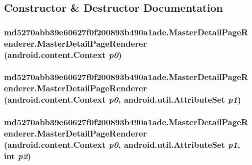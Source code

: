 \subsection{Constructor \& Destructor Documentation}
\hypertarget{classmd5270abb39e60627f0f200893b490a1ade_1_1_master_detail_page_renderer_2d9ba8d783e2532ed875ba9fcda99f6e}{
\subsubsection[{MasterDetailPageRenderer}]{\setlength{\rightskip}{0pt plus 5cm}md5270abb39e60627f0f200893b490a1ade.MasterDetailPageRenderer.MasterDetailPageRenderer (android.content.Context {\em p0})}}
\label{classmd5270abb39e60627f0f200893b490a1ade_1_1_master_detail_page_renderer_2d9ba8d783e2532ed875ba9fcda99f6e}


\hypertarget{classmd5270abb39e60627f0f200893b490a1ade_1_1_master_detail_page_renderer_b7a70ecd01dd5f83f0df23ee11316a02}{
\subsubsection[{MasterDetailPageRenderer}]{\setlength{\rightskip}{0pt plus 5cm}md5270abb39e60627f0f200893b490a1ade.MasterDetailPageRenderer.MasterDetailPageRenderer (android.content.Context {\em p0}, \/  android.util.AttributeSet {\em p1})}}
\label{classmd5270abb39e60627f0f200893b490a1ade_1_1_master_detail_page_renderer_b7a70ecd01dd5f83f0df23ee11316a02}


\hypertarget{classmd5270abb39e60627f0f200893b490a1ade_1_1_master_detail_page_renderer_cd2afc3edbdac35127b2980b773db408}{
\subsubsection[{MasterDetailPageRenderer}]{\setlength{\rightskip}{0pt plus 5cm}md5270abb39e60627f0f200893b490a1ade.MasterDetailPageRenderer.MasterDetailPageRenderer (android.content.Context {\em p0}, \/  android.util.AttributeSet {\em p1}, \/  int {\em p2})}}
\label{classmd5270abb39e60627f0f200893b490a1ade_1_1_master_detail_page_renderer_cd2afc3edbdac35127b2980b773db408}




